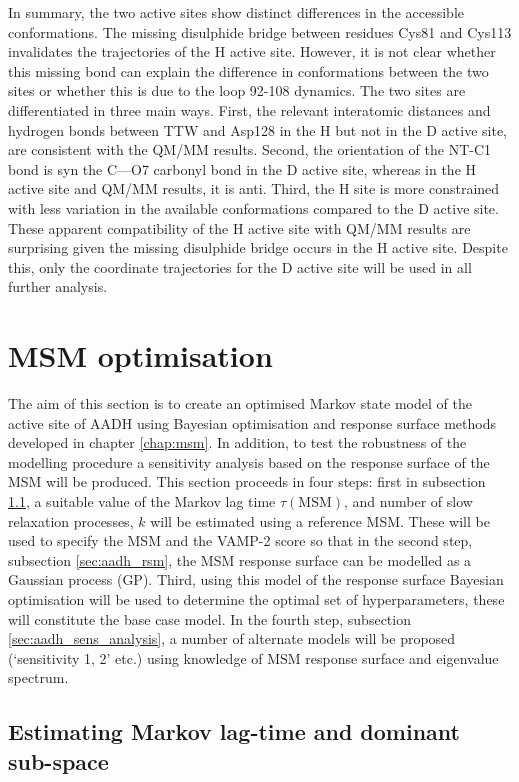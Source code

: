 In summary, the two active sites show distinct differences in the accessible conformations. The missing disulphide bridge between residues Cys81 and Cys113 invalidates the trajectories of the H active site. However, it is not clear whether this missing bond can explain the difference in conformations between the two sites or whether this is due to the loop 92-108 dynamics. The two sites are differentiated in three main ways. First, the relevant interatomic distances and hydrogen bonds between TTW and Asp128 in the H but not in the D active site, are consistent with the QM/MM results. Second, the orientation of the NT-C1 bond is syn the C---O7 carbonyl bond in the D active site, whereas in the H active site and QM/MM results, it is anti. Third, the H site is more constrained with less variation in the available conformations compared to the  D active site. These apparent compatibility of the H active site with QM/MM results are surprising given the missing disulphide bridge occurs in the H active site. Despite this, only the  coordinate trajectories for the D active site will be used in all further analysis.  

\section{MSM optimisation}\label{sec:aadh_optimisation}

The aim of this section is to create an optimised Markov state model of the active site of AADH using Bayesian optimisation and response surface methods developed in chapter \ref{chap:msm}. In addition, to test the robustness of the modelling procedure a sensitivity analysis based on the response surface of the MSM will be produced. This section proceeds in four steps: first in subsection \ref{sec:aadh_est_tau_k}, a suitable  value of the Markov lag time $\tau(\mathrm{MSM})$, and number of slow relaxation processes, $k$ will be estimated using a reference MSM. These will be used to specify the MSM and the VAMP-2 score so that in the second step, subsection \ref{sec:aadh_rsm},  the MSM response surface can be modelled as a Gaussian process (GP). Third, using this model of the response surface Bayesian optimisation will be used to determine the optimal set of hyperparameters, these will constitute the base case model.  In the fourth step, subsection \ref{sec:aadh_sens_analysis}, a number of alternate models will be proposed (`sensitivity 1, 2' etc.)  using knowledge of MSM response surface and eigenvalue spectrum.  

\subsection{Estimating Markov lag-time and dominant sub-space}\label{sec:aadh_est_tau_k}

